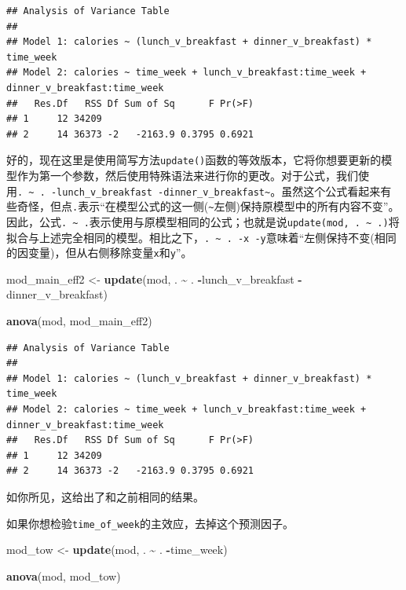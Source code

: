 \documentclass[
]{book}
\newenvironment{Shaded}{\begin{snugshade}}{\end{snugshade}}
\newcommand{\FunctionTok}[1]{\textcolor[rgb]{0.13,0.29,0.53}{\textbf{#1}}}
\newcommand{\NormalTok}[1]{#1}
\newcommand{\OtherTok}[1]{\textcolor[rgb]{0.56,0.35,0.01}{#1}}
\newcommand{\SpecialCharTok}[1]{\textcolor[rgb]{0.81,0.36,0.00}{\textbf{#1}}}
\begin{document}
\begin{verbatim}
## Analysis of Variance Table
## 
## Model 1: calories ~ (lunch_v_breakfast + dinner_v_breakfast) * time_week
## Model 2: calories ~ time_week + lunch_v_breakfast:time_week + dinner_v_breakfast:time_week
##   Res.Df   RSS Df Sum of Sq      F Pr(>F)
## 1     12 34209                           
## 2     14 36373 -2   -2163.9 0.3795 0.6921
\end{verbatim}

好的，现在这里是使用简写方法\texttt{update()}函数的等效版本，它将你想要更新的模型作为第一个参数，然后使用特殊语法来进行你的更改。对于公式，我们使用\texttt{.\ \textasciitilde{}\ .\ -lunch\_v\_breakfast\ -dinner\_v\_breakfast\textasciitilde{}}。虽然这个公式看起来有些奇怪，但点\texttt{.}表示``在模型公式的这一侧(\texttt{\textasciitilde{}}左侧)保持原模型中的所有内容不变''。因此，公式\texttt{.\ \textasciitilde{}\ .}表示使用与原模型相同的公式；也就是说\texttt{update(mod,\ .\ \textasciitilde{}\ .)}将拟合与上述完全相同的模型。相比之下，\texttt{.\ \textasciitilde{}\ .\ -x\ -y}意味着``左侧保持不变(相同的因变量)，但从右侧移除变量\texttt{x}和\texttt{y}''。

\begin{Shaded}
\begin{Highlighting}[]
\NormalTok{mod\_main\_eff2 }\OtherTok{\textless{}{-}} \FunctionTok{update}\NormalTok{(mod, . }\SpecialCharTok{\textasciitilde{}}\NormalTok{ . }\SpecialCharTok{{-}}\NormalTok{lunch\_v\_breakfast }\SpecialCharTok{{-}}\NormalTok{dinner\_v\_breakfast)}

\FunctionTok{anova}\NormalTok{(mod, mod\_main\_eff2)}
\end{Highlighting}
\end{Shaded}

\begin{verbatim}
## Analysis of Variance Table
## 
## Model 1: calories ~ (lunch_v_breakfast + dinner_v_breakfast) * time_week
## Model 2: calories ~ time_week + lunch_v_breakfast:time_week + dinner_v_breakfast:time_week
##   Res.Df   RSS Df Sum of Sq      F Pr(>F)
## 1     12 34209                           
## 2     14 36373 -2   -2163.9 0.3795 0.6921
\end{verbatim}

如你所见，这给出了和之前相同的结果。

如果你想检验\texttt{time\_of\_week}的主效应，去掉这个预测因子。

\begin{Shaded}
\begin{Highlighting}[]
\NormalTok{mod\_tow }\OtherTok{\textless{}{-}} \FunctionTok{update}\NormalTok{(mod, . }\SpecialCharTok{\textasciitilde{}}\NormalTok{ . }\SpecialCharTok{{-}}\NormalTok{time\_week)}

\FunctionTok{anova}\NormalTok{(mod, mod\_tow)}
\end{Highlighting}
\end{Shaded}
\end{document}
